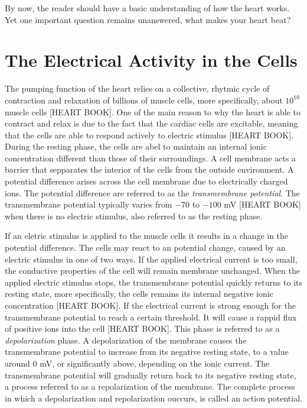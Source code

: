 By now, the reader should have a basic understanding of how the heart works. Yet one important question remains unanswered, what makes your heart beat?

\section{The Electrical Activity in the Cells}
The pumping function of the heart relies on a collective, rhytmic cycle of contraction and relaxation of billions of muscle cells, more specifically, about \(10^{10}\) muscle cells [HEART BOOK]. One of the main reason to why the heart is able to contract and relax is due to the fact that the cardiac cells are excitable, meaning that the cells are able to respond actively to electric stimulus [HEART BOOK]. During the resting phase, the cells are abel to maintain an internal ionic concentration different than those of their surroundings. A cell membrane acts a barrier that sepparates the interior of the cells from the outside environment. A potential difference arises across the cell membrane due to electrically charged ions. The potential difference are referred to as the \textit{transmembrane potential}. The transmembrane potential typically varies from \(-70\) to \(-100\) mV [HEART BOOK] when there is no electric stimulus, also referred to as the resting phase. 

If an eletric stimulus is applied to the muscle cells it results in a change in the potential difference. The cells may react to an potential change, caused by an electric stimulus in one of two ways. If the applied electrical current is too small, the conductive properties of the cell will remain membrane unchanged. When the applied electric stimulus stops, the transmembrane potential quickly returns to its resting state, more specifically, the cells remains its internal negative ionic concentration [HEART BOOK]. If the electrical current is strong enough for the transmembrane potential to reach a certain threshold. It will cause a rappid flux of positive ions into the cell [HEART BOOK]. This phase is referred to as a \textit{depolarization} phase. A depolarization of the membrane causes the transmembrane potential to increase from its negative resting state, to a value around \(0\) mV, or significantly above, depending on the ionic current. The transmembrane potential will gradually return back to its negative resting state, a process referred to as a repolarization of the membrane. The complete process in which a depolarization and repolarization ouccurs, is called an action potential. 

